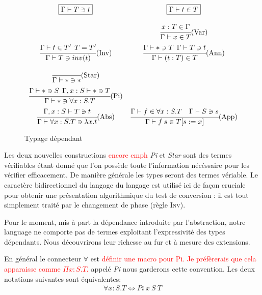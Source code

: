 \documentclass {article}
\theoremstyle{definition}
\theoremstyle{remark}
\newcommand{\todo}[1]{\textcolor{red}{#1}}
\begin{document}
\begin{figure}
  \[
  \begin{array}{cc}
  \boxed{\Gamma\vdash T \ni t}
  &
  \boxed{\Gamma\vdash t \in T}
  \bigskip
  \\ 
  &
  \cfrac{x:T \in \Gamma}
        {\Gamma \vdash x \in T }\mbox{(Var)}
  \medskip
  \\
  \cfrac{\Gamma \vdash t \in T' \:\: T=T'}
        {\Gamma\vdash T \ni inv(t)}\mbox{(Inv)}
  &
  \cfrac{\Gamma\vdash * \ni T \:\:\Gamma\vdash T \ni t}
        {\Gamma\vdash (t:T) \in T}\mbox{(Ann)}
  \medskip
  \\
  \cfrac{}
        {\Gamma \vdash * \ni *}\mbox{(Star)} 
  \medskip
  \\
  \cfrac{\Gamma \vdash * \ni S\:\:\Gamma,x:S \vdash *\ni T}
        {\Gamma\vdash * \ni \forall x:S.T}\mbox{(Pi)}
  \medskip
  \\
  \cfrac{\Gamma,x:S\vdash T \ni t}
        {\Gamma \vdash \forall x:S.T \ni \lambda x. t}\mbox{(Abs)} 
  & 
  \cfrac{\Gamma \vdash f \in \forall x:S.T \quad \Gamma\vdash S \ni s }
        {\Gamma\vdash f\:s\in \subst{T}{s}{x}}\mbox{(App)} 
  \end{array}
  \]
  
  \caption{Typage dépendant}
  \label{fig:typage dependant} 
\end{figure}

Les deux nouvelles constructions \todo{encore emph} \emph{Pi} et
\emph{Star} sont des termes vérifiables étant donné que l'on possède
toute l'information nécéssaire pour les vérifier efficacement. De
manière générale les types seront des termes vériable.  Le caractère
bidirectionnel du langage du langage est utilisé ici de façon cruciale
pour obtenir une présentation algorithmique du test de conversion : il
est tout simplement traité par le changement de phase (règle
\textsc{Inv}).

Pour le moment, mis à part la dépendance introduite par l'abstraction, notre language ne comporte pas de termes exploitant 
l'expressivité des types dépendants. Nous découvrirons leur richesse au fur et à mesure des extensions.

En général le connecteur $\forall$ est \todo{définir une macro pour Pi. Je préfèrerais que cela apparaisse comme $\Pi x : S. T$.} appelé \emph{Pi} nous garderons cette convention.
Les deux notations suivantes sont équivalentes: 
\begin{align*}  
  \forall x:S.T \Leftrightarrow Pi\: x\: S\: T
\end{align*}
\end{document}
